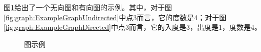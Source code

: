\begin{example}
图\ref{fig:graph:ExampleGraph}给出了一个无向图和有向图的示例。其中，对于图\ref{fig:graph:ExampleGraphUndirected}中点3而言，它的度数是4；对于图\ref{fig:graph:ExampleGraphDirected}中点3而言，它的入度是3，出度是1，度数是4。

\begin{figure}[h]
   \centering
{}
       \hspace{0.1in}
 \caption{ 图示例}%
\vspace{-0.2in}
 \label{fig:graph:ExampleGraph}
\end{figure}
\end{example}

